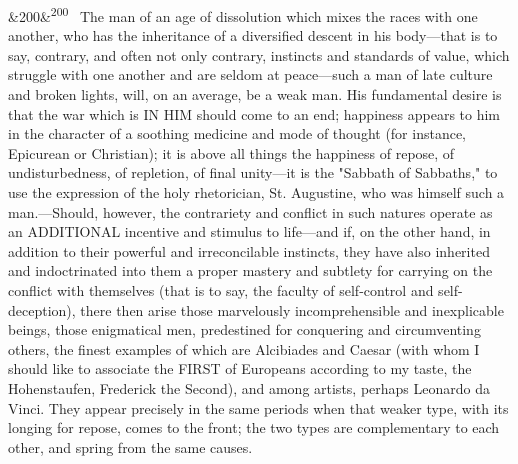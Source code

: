 \documentclass[12pt]{article}
\newcommand{\para}[1][]{\par\noindent\ifx&#1&\else\textsuperscript{\footnotesize #1}~\fi}
\begin{document}
\para[200] The man of an age of dissolution which mixes the races with one another, who has the inheritance of a diversified descent in his body---that is to say, contrary, and often not only contrary, instincts and standards of value, which struggle with one another and are seldom at peace---such a man of late culture and broken lights, will, on an average, be a weak man. His fundamental desire is that the war which is IN HIM should come to an end; happiness appears to him in the character of a soothing medicine and mode of thought (for instance, Epicurean or Christian); it is above all things the happiness of repose, of undisturbedness, of repletion, of final unity---it is the "Sabbath of Sabbaths," to use the expression of the holy rhetorician, St. Augustine, who was himself such a man.---Should, however, the contrariety and conflict in such natures operate as an ADDITIONAL incentive and stimulus to life---and if, on the other hand, in addition to their powerful and irreconcilable instincts, they have also inherited and indoctrinated into them a proper mastery and subtlety for carrying on the conflict with themselves (that is to say, the faculty of self-control and self-deception), there then arise those marvelously incomprehensible and inexplicable beings, those enigmatical men, predestined for conquering and circumventing others, the finest examples of which are Alcibiades and Caesar (with whom I should like to associate the FIRST of Europeans according to my taste, the Hohenstaufen, Frederick the Second), and among artists, perhaps Leonardo da Vinci. They appear precisely in the same periods when that weaker type, with its longing for repose, comes to the front; the two types are complementary to each other, and spring from the same causes.
\end{document}
